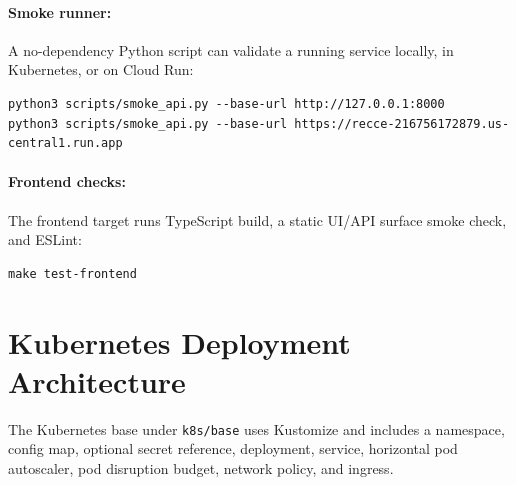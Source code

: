 \documentclass[11pt]{article}
\begin{document}
\paragraph{Smoke runner:}
A no-dependency Python script can validate a running service locally, in
Kubernetes, or on Cloud Run:

\begin{lstlisting}
python3 scripts/smoke_api.py --base-url http://127.0.0.1:8000
python3 scripts/smoke_api.py --base-url https://recce-216756172879.us-central1.run.app
\end{lstlisting}

\paragraph{Frontend checks:}
The frontend target runs TypeScript build, a static UI/API surface smoke check,
and ESLint:

\begin{lstlisting}
make test-frontend
\end{lstlisting}

\section{Kubernetes Deployment Architecture}

The Kubernetes base under \texttt{k8s/base} uses Kustomize and includes a
namespace, config map, optional secret reference, deployment, service,
horizontal pod autoscaler, pod disruption budget, network policy, and ingress.
\end{document}
